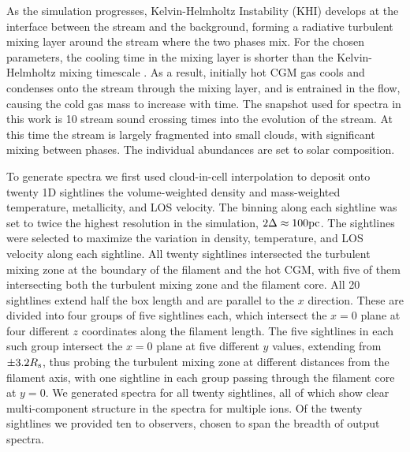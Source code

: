 \documentclass[fleqn,usenatbib]{mnras}
\begin{document}
As the simulation progresses, Kelvin-Helmholtz Instability (KHI) develops at the interface between the stream and the background, forming a radiative turbulent mixing layer around the stream where the two phases mix.
For the chosen parameters, the cooling time in the mixing layer is shorter than the Kelvin-Helmholtz mixing timescale \citep{mandelker2020Instability}.
As a result, initially hot CGM gas cools and condenses onto the stream through the mixing layer, and is entrained in the flow, causing the cold gas mass to increase with time.
The snapshot used for spectra in this work is 10 stream sound crossing times into the evolution of the stream.
At this time the stream is largely fragmented into small clouds, with significant mixing between phases.
The individual abundances are set to solar composition.

To generate spectra we first used cloud-in-cell interpolation to deposit onto twenty 1D sightlines the volume-weighted density and mass-weighted temperature, metallicity, and LOS velocity.
The binning along each sightline was set to twice the highest resolution in the simulation, $2\Delta \approx 100{\rm pc}$.
The sightlines were selected to maximize the variation in density, temperature, and LOS velocity along each sightline.
All twenty sightlines intersected the turbulent mixing zone at the boundary of the filament and the hot CGM, with five of them intersecting both the turbulent mixing zone and the filament core.
All 20 sightlines extend half the box length and are parallel to the $x$ direction.
These are divided into four groups of five sightlines each, which intersect the $x=0$ plane at four different $z$ coordinates along the filament length.
The five sightlines in each such group intersect the $x=0$ plane at five different $y$ values, extending from $\pm 3.2R_{\rm s}$, thus probing the turbulent mixing zone at different distances from the filament axis, with one sightline in each group passing through the filament core at $y=0$.
We generated spectra for all twenty sightlines, all of which show clear multi-component structure in the spectra for multiple ions.
Of the twenty sightlines we provided ten to observers, chosen to span the breadth of output spectra.
\end{document}
